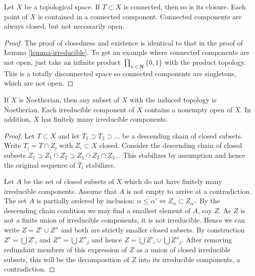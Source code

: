 \begin{lemma}
\label{lemma-connected-components}
Let $X$ be a topological space. If $T \subset X$ is connected,
then so is its closure. Each point of $X$ is contained
in a connected component. Connected components are always closed,
but not necessarily open.
\end{lemma}

\begin{proof}
The proof of closedness and existence is identical to that in
the proof of Lemma \ref{lemma-irreducible}. To get an example
where connected components are not open, just take 
an infinite product $\prod_{n \in \mathbf{N}} \{0,1\}$
with the product topology. This is a totally disconnected
space so connected components are singletons, which are
not open.
\end{proof}

\begin{lemma}
\label{lemma-Noetherian}
If $X$ is Noetherian, then any subset of $X$ with the induced
topology is Noetherian. Each irreducible component of $X$
contains a nonempty open of $X$. In addition, $X$ has finitely many
irreducible components.
\end{lemma}

\begin{proof}
Let $T \subset X$ and let $T_1 \supset T_2 \supset \ldots$
be a descending chain of closed subsets. Write $T_i = 
T \cap Z_i$ with $Z_i \subset X$ closed. Consider the descending
chain of closed subsets
$Z_1 \supset Z_1\cap Z_2 \supset Z_1 \cap Z_2 \cap Z_3 \ldots$
This stabilizes by assumption and hence the original sequence
of $T_i$ stabilizes.

\medskip\noindent
Let $A$ be the set of closed subsets of $X$ which do not
have finitely many irreducible components. Assume that
$A$ is not empty to arrive at a contradiction. 
The set $A$ is partially ordered by inclusion: $\alpha \leq \alpha'
\Leftrightarrow Z_{\alpha} \subset Z_{\alpha'}$.
By the descending chain condition we may find a 
smallest element of $A$, say $Z$. As $Z$ is not a finite
union of irreducible components, it is not irreducible.
Hence we can write $Z = Z' \cup Z''$ and both are strictly smaller
closed subsets. By construction $Z' = \bigcup Z'_i$ and
$Z'' = \bigcup Z''_j$ and hence $Z = \bigcup Z'_i \cup \bigcup Z''_j$.
After removing redundant members of this expression of $Z$
as a union of closed irreducible subsets, this will be the decomposition
of $Z$ into its irreducible components, a contradiction.
\end{proof}

